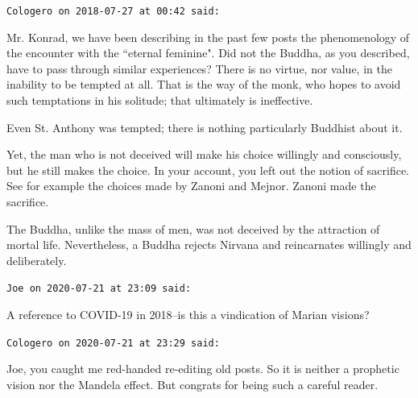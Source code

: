 \begin{footnotesize}
\begin{sffamily}
\hfill

\texttt{Cologero on 2018-07-27 at 00:42 said: }

Mr. Konrad, we have been describing in the past few posts the phenomenology of the encounter with the ``eternal feminine". Did not the Buddha, as you described, have to pass through similar experiences? There is no virtue, nor value, in the inability to be tempted at all. That is the way of the monk, who hopes to avoid such temptations in his solitude; that ultimately is ineffective.

Even St. Anthony was tempted; there is nothing particularly Buddhist about it.

Yet, the man who is not deceived will make his choice willingly and consciously, but he still makes the choice. In your account, you left out the notion of sacrifice. See for example the choices made by Zanoni and Mejnor. Zanoni made the sacrifice.

The Buddha, unlike the mass of men, was not deceived by the attraction of mortal life. Nevertheless, a Buddha rejects Nirvana and reincarnates willingly and deliberately.


\hfill

\texttt{Joe on 2020-07-21 at 23:09 said: }

A reference to COVID-19 in 2018–is this a vindication of Marian visions?


\hfill

\texttt{Cologero on 2020-07-21 at 23:29 said: }

Joe, you caught me red-handed re-editing old posts. So it is neither a prophetic vision nor the Mandela effect. But congrats for being such a careful reader.


\end{sffamily}\end{footnotesize}
